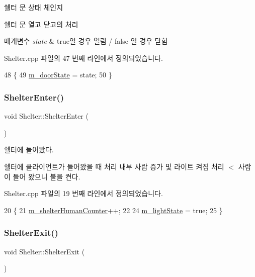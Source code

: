 쉘터 문 상태 체인지 

쉘터 문 열고 닫고의 처리


\begin{DoxyParams}{매개변수}
{\em state} & true일 경우 열림 / false 일 경우 닫힘 \\
\hline
\end{DoxyParams}


Shelter.\+cpp 파일의 47 번째 라인에서 정의되었습니다.


\begin{DoxyCode}
48 \{
49     \hyperlink{class_shelter_a8deab51bd304b5cb728c2e739f5afa15}{m\_doorState} = state;
50 \}
\end{DoxyCode}
\mbox{\label{class_shelter_a488b5cd851099aeb8e959c1650d9cdeb}} 
\subsubsection{\texorpdfstring{Shelter\+Enter()}{ShelterEnter()}}
{\footnotesize\ttfamily void Shelter\+::\+Shelter\+Enter (\begin{DoxyParamCaption}{ }\end{DoxyParamCaption})}



쉘터에 들어왔다. 

쉘터에 클라이언트가 들어왔을 때 처리  내부 사람 증가 및 라이트 켜짐 처리 $<$ 사람이 들어 왔으니 불을 켠다. 

Shelter.\+cpp 파일의 19 번째 라인에서 정의되었습니다.


\begin{DoxyCode}
20 \{
21     \hyperlink{class_shelter_a31a7132fc38ce768924bb59302d02d82}{m\_shelterHumanCounter}++;
22 
24     \hyperlink{class_shelter_ad18359b14559c0f0e77fdb416b39529f}{m\_lightState} = \textcolor{keyword}{true};
25 \}
\end{DoxyCode}
\mbox{\label{class_shelter_acb6d900dbdda90cdfe09aa03005e83ca}} 
\subsubsection{\texorpdfstring{Shelter\+Exit()}{ShelterExit()}}
{\footnotesize\ttfamily void Shelter\+::\+Shelter\+Exit (\begin{DoxyParamCaption}{ }\end{DoxyParamCaption})}



